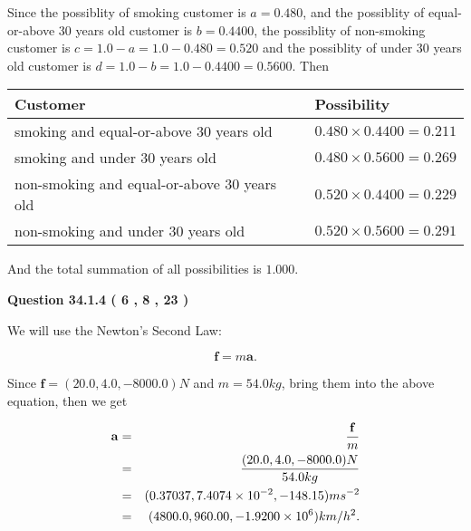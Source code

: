 \documentclass[12pt]{article}
\begin{document}
 

Since the possiblity of  %
smoking customer is $ a =  %
0.480 $,
and the possiblity of  %
equal-or-above 30 years old customer is $ b =  %
0.4400 $,
the possiblity of  %
non-smoking customer is $ c = 1.0 - a = 1.0 -
0.480
=  %
0.520 $ and the possiblity of  %
under 30 years old
customer is $ d = 1.0 - b = 1.0 -  %
0.4400 =  %
0.5600  $.
Then
 
\noindent
\begin{tabular}{|l|l|}
\hline
Customer & Possibility \\
\hline
smoking  and  %
equal-or-above 30 years old  &
  $ %
0.480 \times  %
0.4400 =  %
0.211$ \\
\hline
smoking  and  %
under 30 years old &
  $ %
0.480 \times  %
0.5600 =  %
0.269$ \\
\hline
 non-smoking and  %
equal-or-above 30 years old  &
  $ %
0.520 \times  %
0.4400 =  %
0.229$ \\
\hline
 non-smoking and  %
under 30 years old &
  $ %
0.520 \times  %
0.5600 =  %
0.291$ \\
\hline
\end{tabular}
 
\noindent
And the total summation of all possibilities is $  %
1.000 $.
 
 
 
 
  
\vspace{0.2in}
  
{\textbf{\Large{Question
34.1.4 
 (           6 ,           8 ,          23 )
}}}
  
  
 
 

We will use the Newton's Second Law:
 
\[
\mathbf{f}=m\mathbf{a}.
\]
 
Since $\mathbf{f}=( %
20.0,  %
4.0,  %
-8000.0 )N$
and $m= %
54.0kg$, bring them into the above equation, then we get
 
\begin{eqnarray*}
\mathbf{a}&=&\frac{\mathbf{f}}m  \\
&=&\frac{(
20.0 ,
4.0 ,
-8000.0 )N
}{ %
54.0 kg}  \\
&=&(
0.37037 ,
7.4074 \times 10^{-2},
-148.15
)ms^{-2} \\
&=&(
4800.0 ,
960.00 ,
-1.9200 \times 10^{6}
)km/h^2.
\end{eqnarray*}
 
 
 
  
\vspace{0.2in}
  
\end{document}
